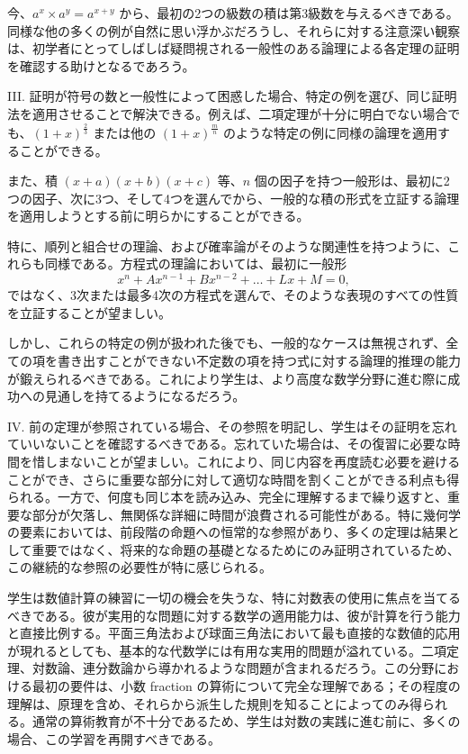 \documentclass[a4paper,11pt,openany]{ltjsbook}
\begin{document}
今、$a^{x} × a^{y} = a^{x+y}$ から、最初の2つの級数の積は第3級数を与えるべきである。同様な他の多くの例が自然に思い浮かぶだろうし、それらに対する注意深い観察は、初学者にとってしばしば疑問視される一般性のある論理による各定理の証明を確認する助けとなるであろう。

III. 証明が符号の数と一般性によって困惑した場合、特定の例を選び、同じ証明法を適用させることで解決できる。例えば、二項定理が十分に明白でない場合でも、$(1 + x)^{\frac{2}{3}}$ または他の $(1 + x)^{\frac{m}{n}}$ のような特定の例に同様の論理を適用することができる。

また、積 $(x + a)(x + b)(x + c)$ 等、$n$ 個の因子を持つ一般形は、最初に2つの因子、次に3つ、そして4つを選んでから、一般的な積の形式を立証する論理を適用しようとする前に明らかにすることができる。

特に、順列と組合せの理論、および確率論がそのような関連性を持つように、これらも同様である。方程式の理論においては、最初に一般形
\[
x^{n} + Ax^{n-1} + Bx^{n-2} + \dots + Lx + M = 0,
\]
ではなく、3次または最多4次の方程式を選んで、そのような表現のすべての性質を立証することが望ましい。

しかし、これらの特定の例が扱われた後でも、一般的なケースは無視されず、全ての項を書き出すことができない不定数の項を持つ式に対する論理的推理の能力が鍛えられるべきである。これにより学生は、より高度な数学分野に進む際に成功への見通しを持てるようになるだろう。

IV. 前の定理が参照されている場合、その参照を明記し、学生はその証明を忘れていいないことを確認するべきである。忘れていた場合は、その復習に必要な時間を惜しまないことが望ましい。これにより、同じ内容を再度読む必要を避けることができ、さらに重要な部分に対して適切な時間を割くことができる利点も得られる。一方で、何度も同じ本を読み込み、完全に理解するまで繰り返すと、重要な部分が欠落し、無関係な詳細に時間が浪費される可能性がある。特に幾何学の要素においては、前段階の命題への恒常的な参照があり、多くの定理は結果として重要ではなく、将来的な命題の基礎となるためにのみ証明されているため、この継続的な参照の必要性が特に感じられる。

学生は数値計算の練習に一切の機会を失うな、特に対数表の使用に焦点を当てるべきである。彼が実用的な問題に対する数学の適用能力は、彼が計算を行う能力と直接比例する。平面三角法および球面三角法において最も直接的な数値的応用が現れるとしても、基本的な代数学には有用な実用的問題が溢れている。二項定理、対数論、連分数論から導かれるような問題が含まれるだろう。この分野における最初の要件は、小数 fraction の算術について完全な理解である；その程度の理解は、原理を含め、それらから派生した規則を知ることによってのみ得られる。通常の算術教育が不十分であるため、学生は対数の実践に進む前に、多くの場合、この学習を再開すべきである。
\end{document}
